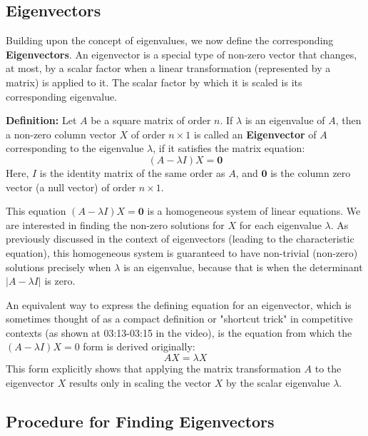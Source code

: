 \documentclass{article}
\begin{document}

\subsection{Eigenvectors} %

Building upon the concept of eigenvalues, we now define the corresponding \textbf{Eigenvectors}. An eigenvector is a special type of non-zero vector that changes, at most, by a scalar factor when a linear transformation (represented by a matrix) is applied to it. The scalar factor by which it is scaled is its corresponding eigenvalue.

\textbf{Definition:}
Let $A$ be a square matrix of order $n$. If $\lambda$ is an eigenvalue of $A$, then a non-zero column vector $X$ of order $n \times 1$ is called an \textbf{Eigenvector} of $A$ corresponding to the eigenvalue $\lambda$, if it satisfies the matrix equation:
\[ (A - \lambda I) X = \mathbf{0} \]
Here, $I$ is the identity matrix of the same order as $A$, and $\mathbf{0}$ is the column zero vector (a null vector) of order $n \times 1$.

This equation $(A - \lambda I) X = \mathbf{0}$ is a homogeneous system of linear equations. We are interested in finding the non-zero solutions for $X$ for each eigenvalue $\lambda$. As previously discussed in the context of eigenvectors (leading to the characteristic equation), this homogeneous system is guaranteed to have non-trivial (non-zero) solutions precisely when $\lambda$ is an eigenvalue, because that is when the determinant $|A - \lambda I|$ is zero.

An equivalent way to express the defining equation for an eigenvector, which is sometimes thought of as a compact definition or "shortcut trick" in competitive contexts (as shown at 03:13-03:15 in the video), is the equation from which the $(A-\lambda I)X=0$ form is derived originally:
\[ AX = \lambda X \]
This form explicitly shows that applying the matrix transformation $A$ to the eigenvector $X$ results only in scaling the vector $X$ by the scalar eigenvalue $\lambda$.

\subsection{Procedure for Finding Eigenvectors} %
\end{document}

